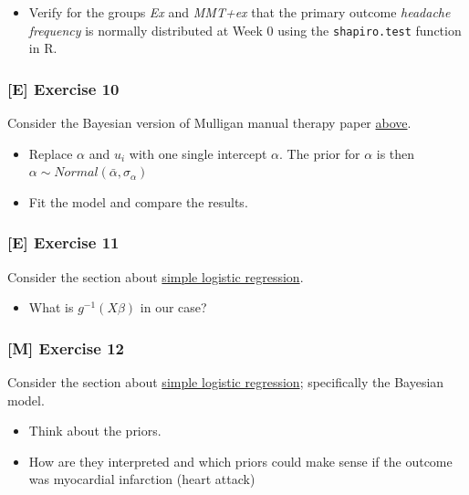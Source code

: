 \documentclass[
]{article}
\providecommand{\tightlist}{%
  \setlength{\itemsep}{0pt}\setlength{\parskip}{0pt}}
\begin{document}
\begin{itemize}
\tightlist
\item
  Verify for the groups \emph{Ex} and \emph{MMT+ex} that the primary
  outcome \emph{headache frequency} is normally distributed at Week
  \(0\) using the \texttt{shapiro.test} function in R.
\end{itemize}

\subsubsection{{[}E{]} Exercise 10}\label{exercise10_LMM}

Consider the Bayesian version of Mulligan manual therapy paper
\hyperref[mulligan_bayesian]{above}.

\begin{itemize}
\tightlist
\item
  Replace \(\alpha\) and \(u_i\) with one single intercept \(\alpha\).
  The prior for \(\alpha\) is then
  \(\alpha \sim Normal(\bar{\alpha}, \sigma_{\alpha})\)
\item
  Fit the model and compare the results.
\end{itemize}

\subsubsection{{[}E{]} Exercise 11}\label{exercise11_LMM}

Consider the section about \hyperref[simple_logistic_regression]{simple
logistic regression}.

\begin{itemize}
\tightlist
\item
  What is \(g^{-1}(X \beta)\) in our case?
\end{itemize}

\subsubsection{{[}M{]} Exercise 12}\label{exercise12_LMM}

Consider the section about \hyperref[simple_logistic_regression]{simple
logistic regression}; specifically the Bayesian model.

\begin{itemize}
\tightlist
\item
  Think about the priors.
\item
  How are they interpreted and which priors could make sense if the
  outcome was myocardial infarction (heart attack)
\end{itemize}
\end{document}
